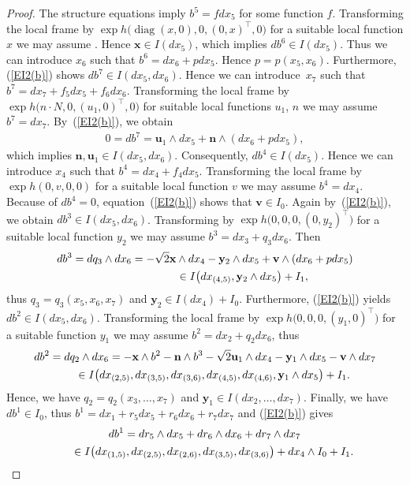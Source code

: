 \documentclass[11pt]{article}
\numberwithin{equation}{section}
\newcommand\bx{{\mathbf x}}
\newcommand\bu{{\mathbf u}}
\newcommand\by{{\mathbf y}}
\newcommand\bn{{\mathbf n}}
\newcommand\bv{{\mathbf v}}
\newcommand{\diag}{\operatorname{diag}}
\begin{document}
\begin{proof} The structure equations imply $b^5=fdx_5$ for some function $f$. Transforming the local frame by $\exp h\big(\diag(x,0),0,(0,x)^\top,0\big)$ for a suitable local function $x$ we may assume . Hence $\bx\in I(dx_5)$, which implies $db^6\in I(dx_5)$. Thus we can introduce $x_6$ such that $b^6=dx_6 +p dx_5$. Hence $p=p(x_5,x_6)$. Furthermore, (\ref{EI2(b)}) shows $db^7\in I(dx_5, dx_6)$. Hence we can introduce~$x_7$ such that $b^7=dx_7+f_5 dx_5+f_6 dx_6$. Transforming the local frame by $\exp h\big(n\cdot N,0,(u_1,0)^\top,0\big)$ for suitable local functions $u_1$, $n$ we may assume $b^7=dx_7$. By~(\ref{EI2(b)}), we obtain
\begin{gather*}0=db^7=\bu_1\wedge dx_5 +\bn \wedge (dx_6+p dx_5),\end{gather*}
which implies $\bn, \bu_1\in I(dx_5,dx_6)$. Consequently, $db^4\in I(dx_5)$. Hence we can introduce $x_4$ such that $b^4=dx_4+f_4 dx_5$. Transforming the local frame by $\exp h(0,v,0,0)$ for a suitable local function $v$ we may assume $b^4=dx_4$. Because of $db^4=0$, equation~(\ref{EI2(b)}) shows that $\bv\in I_0$. Again by~(\ref{EI2(b)}), we obtain $db^3\in I(dx_5,dx_6)$. Transforming by $\exp h\big(0,0,0,(0,y_2)^\top\big)$ for a suitable local function $y_2$ we may assume $b^3=dx_3+q_3 dx_6$. Then
\begin{gather*}
db^3 = dq_3\wedge dx_6 = -\sqrt2 \bx\wedge dx_4-\by_2\wedge dx_5+\bv\wedge (dx_6+pdx_5)\\
\hphantom{db^3 = dq_3\wedge dx_6}{} \in I\big(dx_{(4,5)}, \by_2\wedge dx_5\big)+I_1,
\end{gather*}
thus $q_3=q_3(x_5,x_6,x_7)$ and $\by_2\in I(dx_4)+I_0$. Furthermore, (\ref{EI2(b)}) yields $db^2\in I(dx_5,dx_6)$. Transforming the local frame by $\exp h\big(0,0,0,(y_1,0)^\top\big)$ for a suitable function $y_1$ we may assume $b^2=dx_2+q_2 dx_6$, thus
\begin{gather*}
db^2 = dq_2\wedge dx_6 = -\bx\wedge b^2 -\bn \wedge b^3 -\sqrt2 \bu_1\wedge dx_4-\by_1\wedge dx_5-\bv\wedge dx_7\\
\hphantom{db^2}{} \in I\big(dx_{(2,5)}, dx_{(3,5)}, dx_{(3,6)}, dx_{(4,5)}, dx_{(4,6)}, \by_1\wedge dx_5\big)+I_1.
\end{gather*}
Hence, we have $q_2=q_2(x_3,\dots,x_7)$ and $\by_1\in I(dx_2,\dots,dx_7 )$. Finally, we have $db^1\in I_0$, thus $b^1=dx_1+r_5dx_5+r_6dx_6+r_7dx_7$ and (\ref{EI2(b)}) gives
\begin{gather*}
db^1 = dr_5\wedge dx_5+dr_6\wedge dx_6+dr_7\wedge dx_7\\
\hphantom{db^1}{} \in I\big( dx_{(1,5)}, dx_{(2,5)}, dx_{(2,6)}, dx_{(3,5)}, dx_{(3,6)} \big)+dx_4\wedge I_0 +I_1.
\end{gather*}


\end{proof}
\end{document}
